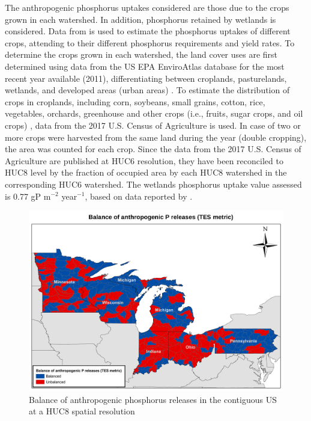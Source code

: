 \begin{refsection}[referencesCh4]
The anthropogenic phosphorus uptakes considered are those due to the crops grown in each watershed. In addition, phosphorus retained by wetlands is considered. Data from \citet{USDAWaste} is used to estimate the phosphorus uptakes of different crops, attending to their different phosphorus requirements and yield rates. To determine the crops grown in each watershed, the land cover uses are first determined using data from the US EPA EnviroAtlas database for the most recent year available (2011), differentiating between croplands, pasturelands, wetlands, and developed areas (urban areas) \citep{EnviroAtlas}. To estimate the distribution of crops in croplands, including corn, soybeans, small grains, cotton, rice, vegetables, orchards, greenhouse and other crops (i.e., fruits, sugar crops, and oil crops) \citep{2017CensusofAgriculture}, data from the 2017 U.S. Census of Agriculture is used. In case of two or more crops were harvested from the same land during the year (double cropping), the area was counted for each crop. Since the data from the 2017 U.S. Census of Agriculture are published at HUC6 resolution, they have been reconciled to HUC8 level by the fraction of occupied area by each HUC8 watershed in the corresponding HUC6 watershed. The wetlands phosphorus uptake value assessed is 0.77 gP m$^{-2}$ year$^{-1}$, based on data reported by \citet{Kadlec}.

\begin{figure}[h]
	\centering
	\includegraphics[width=0.95\linewidth, trim={0cm 0cm 0cm 0cm},clip]{gfx/AppendixC/BalanceofP.pdf} 
	\caption{Balance of anthropogenic phosphorus releases in the contiguous US at a HUC8 spatial resolution}
	\label{fig:TECmap}
\end{figure}


\end{refsection}
